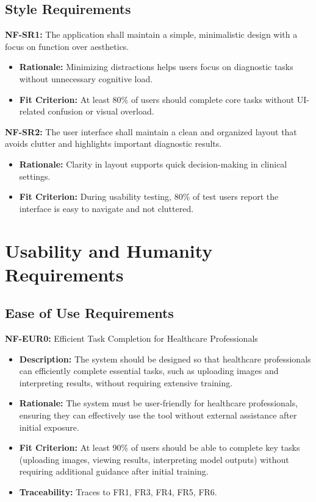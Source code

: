 \documentclass[12pt]{article}
\begin{document}
\subsection{Style Requirements}

\textbf{NF-SR1:} The application shall maintain a simple, minimalistic design with a focus on function over aesthetics.
\begin{itemize}
    \item \textbf{Rationale:} Minimizing distractions helps users focus on diagnostic tasks without unnecessary cognitive load.
    \item \textbf{Fit Criterion:} At least 80\% of users should complete core tasks without UI-related confusion or visual overload.
\end{itemize}

\textbf{NF-SR2:} The user interface shall maintain a clean and organized layout that avoids clutter and highlights important diagnostic results.
\begin{itemize}
    \item \textbf{Rationale:} Clarity in layout supports quick decision-making in clinical settings.
    \item \textbf{Fit Criterion:} During usability testing, 80\% of test users report the interface is easy to navigate and not cluttered.
\end{itemize}

\section{Usability and Humanity Requirements}


\subsection{Ease of Use Requirements}

\textbf{NF-EUR0:} Efficient Task Completion for Healthcare Professionals
\begin{itemize}
    \item \textbf{Description:} The system should be designed so that healthcare professionals can efficiently complete essential tasks, such as uploading images and interpreting results, without requiring extensive training.
    \item \textbf{Rationale:} The system must be user-friendly for healthcare professionals, ensuring they can effectively use the tool without external assistance after initial exposure.
    \item \textbf{Fit Criterion:} At least 90\% of users should be able to complete key tasks (uploading images, viewing results, interpreting model outputs) without requiring additional guidance after initial training.
    \item \textbf{Traceability:} Traces to FR1, FR3, FR4, FR5, FR6.
\end{itemize}
\end{document}
